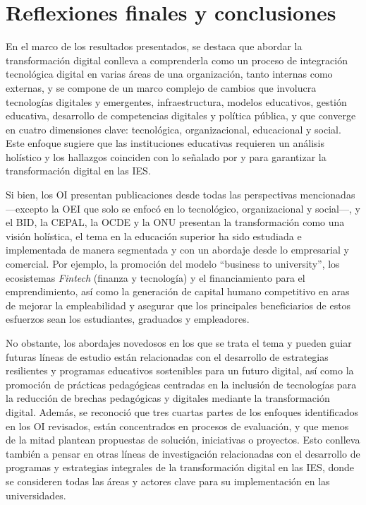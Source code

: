 \section{Reflexiones finales y conclusiones}\label{sec-reflexiones-finales-y-conclusiones}

En el marco de los resultados presentados, se destaca que abordar la
transformación digital conlleva a comprenderla como un proceso de
integración tecnológica digital en varias áreas de una organización,
tanto internas como externas, y se compone de un marco complejo de
cambios que involucra tecnologías digitales y emergentes,
infraestructura, modelos educativos, gestión educativa, desarrollo de
competencias digitales y política pública, y que converge en cuatro
dimensiones clave: tecnológica, organizacional, educacional y social.
Este enfoque sugiere que las instituciones educativas requieren un
análisis holístico y los hallazgos coinciden con lo señalado por \textcite{aditya2021,bikse2021} y \textcite{benavides2020-castro} para garantizar la transformación digital en las
IES.

Si bien, los OI presentan publicaciones desde todas las perspectivas
mencionadas ---excepto la OEI que solo se enfocó en lo tecnológico,
organizacional y social---, y el BID, la CEPAL, la OCDE y la ONU
presentan la transformación como una visión holística, el tema en la
educación superior ha sido estudiada e implementada de manera segmentada
y con un abordaje desde lo empresarial y comercial. Por ejemplo, la
promoción del modelo ``business to university'', los ecosistemas
\emph{Fintech} (finanza y tecnología) y el financiamiento para el
emprendimiento, así como la generación de capital humano competitivo en
aras de mejorar la empleabilidad y asegurar que los principales
beneficiarios de estos esfuerzos sean los estudiantes, graduados y
empleadores.

No obstante, los abordajes novedosos en los que se trata el tema y
pueden guiar futuras líneas de estudio están relacionadas con el
desarrollo de estrategias resilientes y programas educativos sostenibles
para un futuro digital, así como la promoción de prácticas pedagógicas
centradas en la inclusión de tecnologías para la reducción de brechas
pedagógicas y digitales mediante la transformación digital. Además, se
reconoció que tres cuartas partes de los enfoques identificados en los
OI revisados, están concentrados en procesos de evaluación, y que menos
de la mitad plantean propuestas de solución, iniciativas o proyectos.
Esto conlleva también a pensar en otras líneas de investigación
relacionadas con el desarrollo de programas y estrategias integrales de
la transformación digital en las IES, donde se consideren todas las
áreas y actores clave para su implementación en las universidades.

